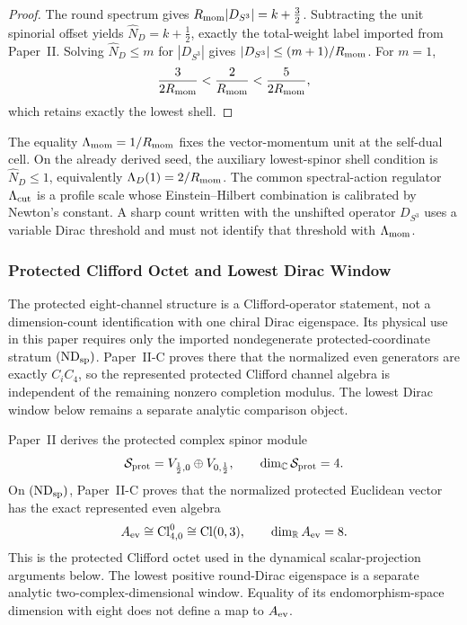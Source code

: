 \documentclass[12pt,a4paper]{article}
\begin{document}
\begin{proof}
The round spectrum gives
\(R_{\mathrm{mom}}|D_{S^3}|=k+\frac32\).  Subtracting the unit spinorial offset yields
\(\widehat N_D=k+\frac12\), exactly the total-weight label imported from
Paper~II.  Solving \(\widehat N_D\le m\) for \(|D_{S^3}|\) gives
\(|D_{S^3}|\le(m+1)/R_{\mathrm{mom}}\).  For \(m=1\),
\[
 \frac{3}{2R_{\mathrm{mom}}}<\frac2{R_{\mathrm{mom}}}<\frac{5}{2R_{\mathrm{mom}}},
\]
which retains exactly the lowest shell.
\end{proof}

\begin{remark}
\label{p3:rem:three-cutoff-roles}
The equality \(\Lambda_{\rm mom}=1/R_{\mathrm{mom}}\) fixes the vector-momentum unit at
the self-dual cell.  On the already derived seed, the auxiliary lowest-spinor shell condition is
\(\widehat N_D\le1\), equivalently \(\Lambda_D(1)=2/R_{\mathrm{mom}}\).  The common
spectral-action regulator \(\Lambda_{\mathrm{cut}}\) is a profile scale whose Einstein--Hilbert
combination is calibrated by Newton's constant.  A sharp count written with
the unshifted operator \(D_{S^3}\) uses a variable Dirac threshold and must not
identify that threshold with \(\Lambda_{\rm mom}\).
\end{remark}


\subsubsection{Protected Clifford Octet and Lowest Dirac Window}

The protected eight-channel structure is a Clifford-operator statement, not
a dimension-count identification with one chiral Dirac eigenspace.  Its
physical use in this paper requires only the imported nondegenerate
protected-coordinate stratum \((\mathrm{ND}_{\rm sp})\).  Paper~II-C proves
there that the normalized even generators are exactly \(C_iC_4\), so the
represented protected Clifford channel algebra is independent of the
remaining nonzero completion modulus.  The lowest Dirac window below remains
a separate analytic comparison object.

\begin{remark}
\label{p3:rem:8mode-protected-carrier}
Paper~II derives the protected complex spinor module
\[
 \mathcal S_{\rm prot}
 =V_{\frac12,0}\oplus V_{0,\frac12},
 \qquad \dim_{\mathbb C}\mathcal S_{\rm prot}=4.
\]
On \((\mathrm{ND}_{\rm sp})\), Paper~II-C proves that the normalized
protected Euclidean vector has the exact represented even algebra
\[
 A_{\rm ev}
 \cong \operatorname{Cl}^0_{4,0}
 \cong \operatorname{Cl}(0,3),
 \qquad \dim_{\mathbb R}A_{\rm ev}=8.
\]
This is the protected Clifford octet used in the dynamical scalar-projection
arguments below.  The lowest positive round-Dirac eigenspace is a separate
analytic two-complex-dimensional window.  Equality of its endomorphism-space
dimension with eight does not define a map to \(A_{\rm ev}\).
\end{remark}
\end{document}
